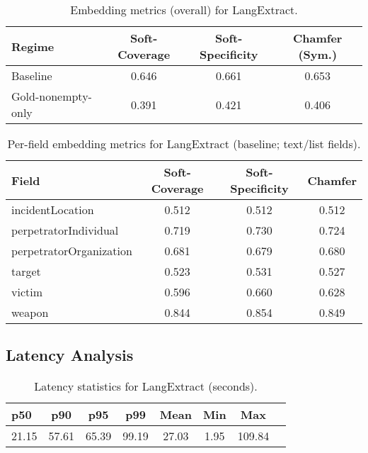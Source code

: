 \begin{table}[H]
    \centering
    \caption{Embedding metrics (overall) for LangExtract.}
    \label{tab:langextract-embed-overall}
    \begin{tabular}{lccc}
        \toprule
        Regime & Soft-Coverage & Soft-Specificity & Chamfer (Sym.) \\
        \midrule
        Baseline & 0.646 & 0.661 & 0.653 \\
        Gold-nonempty-only & 0.391 & 0.421 & 0.406 \\
        \bottomrule
    \end{tabular}
\end{table}

\begin{table}[H]
    \centering
    \caption{Per-field embedding metrics for LangExtract (baseline; text/list fields).}
    \label{tab:langextract-embed-perfield}
    \begin{tabular}{lccc}
        \toprule
        Field & Soft-Coverage & Soft-Specificity & Chamfer \\
        \midrule
        incidentLocation & 0.512 & 0.512 & 0.512 \\
        perpetratorIndividual & 0.719 & 0.730 & 0.724 \\
        perpetratorOrganization & 0.681 & 0.679 & 0.680 \\
        target & 0.523 & 0.531 & 0.527 \\
        victim & 0.596 & 0.660 & 0.628 \\
        weapon & 0.844 & 0.854 & 0.849 \\
        \bottomrule
    \end{tabular}
\end{table}

\subsection*{Latency Analysis}

\begin{table}[H]
    \centering
    \caption{Latency statistics for LangExtract (seconds).}
    \label{tab:langextract-latency}
    \begin{tabular}{lccccccc}
        \toprule
        p50 & p90 & p95 & p99 & Mean & Min & Max \\
        \midrule
        21.15 & 57.61 & 65.39 & 99.19 & 27.03 & 1.95 & 109.84 \\
        \bottomrule
    \end{tabular}
\end{table}

